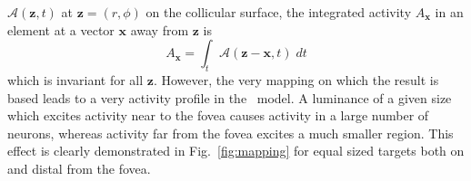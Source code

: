 \documentclass{frontiersSCNS}
\begin{document}
$\mathcal{A}(\mathbf{z},t)$ at $\mathbf{z} = (r,\phi)$ on the collicular
surface, the integrated activity  $A_{\mathbf{x}}$ in an element at a
vector $\mathbf{x}$ away from $\mathbf{z}$ is
\begin{equation}
A_{\mathbf{x}} = \int_t \mathcal{A}(\mathbf{z}-\mathbf{x}, t)\;dt
\end{equation}
which is invariant for all $\mathbf{z}$. However, the very mapping on
which the \cite{tabareau_geometry_2007} result is based leads to a
very  activity profile in the \ccg~model. A luminance of
a given size which excites activity near to the fovea causes activity
in a large number of neurons, whereas activity far from the fovea
excites a much smaller region. This effect is clearly demonstrated in
Fig.~\ref{fig:mapping} for equal sized targets both on and distal from
the fovea.
\end{document}

